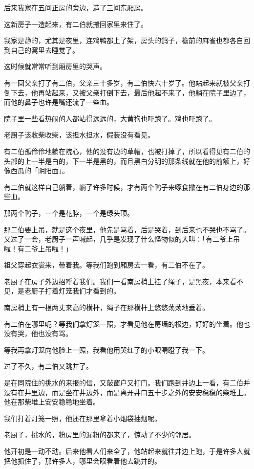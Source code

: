 \documentclass[UTF8]{ctexart}
\begin{document}
后来我家在五间正房的旁边，造了三间东厢房。

这新房子一造起来，有二伯就搬回家里来住了。

我家是静的，尤其是夜里，连鸡鸭都上了架，房头的鸽子，檐前的麻雀也都各自回到自己的窝里去睡觉了。

这时候就常常听到厢房里的哭声。

有一回父亲打了有二伯，父亲三十多岁，有二伯快六十岁了。他站起来就被父亲打倒下去，他再站起来，又被父亲打倒下去，最后他起不来了，他躺在院子里边了，而他的鼻子也许是嘴还流了一些血。

院子里一些看热闹的人都站得远远的，大黄狗也吓跑了。鸡也吓跑了。

老厨子该收柴收柴，该担水担水，假装没有看见。

有二伯孤伶伶地躺在院心，他的没有边的草帽，也被打掉了，所以看得见有二伯的头部的上一半是白的，下一半是黑的，而且黑白分明的那条线就在他的前额上，好像西瓜的「阴阳面」。

有二伯就这样自己躺着，躺了许多时候，才有两个鸭子来啄食撒在有二伯身边的那些血。

那两个鸭子，一个是花脖，一个是绿头顶。

那二伯要上吊，就是这个夜里，他先是骂着，后是哭着，到后来也不哭也不骂了。又过了一会，老厨子一声喊起，几乎是发现了什么怪物似的大叫：「有二爷上吊啦！有二爷上吊啦！」

祖父穿起衣裳来，带着我。等我们跑到厢房去一看，有二伯不在了。

老厨子在房子外边招呼着我们。我们一看南房梢上挂了绳子，是黑夜，本来看不见，是老厨子打着灯笼我们才看到的。

南房梢上有一根两丈来高的横杆，绳子在那横杆上悠悠荡荡地垂着。

有二伯在哪里呢？等我们拿灯笼一照，才看见他在房墙的根边，好好的坐着。他也没有哭，他也没有骂。

等我再拿灯笼向他脸上一照，我看他用哭红了的小眼睛瞪了我一下。

过了不久，有二伯又跳井了。

是在同院住的挑水的来报的信，又敲窗户又打门。我们跑到井边上一看，有二伯并没有在井里边，而是坐在井边外，而是离开井口五十步之外的安安稳稳的柴堆上。他在那柴堆上安安稳稳地坐着。

我们打着灯笼一照，他还在那里拿着小烟袋抽烟呢。

老厨子，挑水的，粉房里的漏粉的都来了，惊动了不少的邻居。

他开初是一动不动。后来他看人们来全了，他站起来就往井边上跑，于是许多人就把他抓住了，那许多人，哪里会眼看着他去跳井的。
\end{document}
